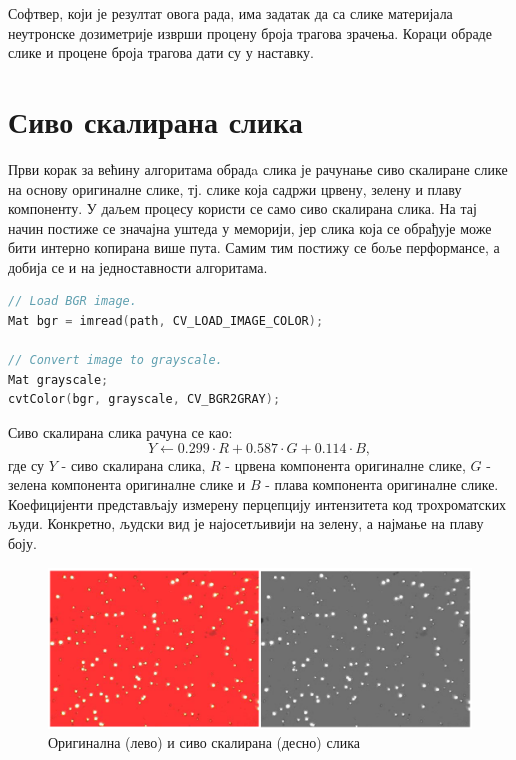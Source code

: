 \documentclass[11pt,a4paper,serbian,oneside]{book}
\begin{document}
Софтвер, који је резултат овога рада, има задатак да са слике материјала неутронске дозиметрије изврши процену броја трагова зрачења. Кораци обраде слике и процене броја трагова дати су у наставку.

\section{Сиво скалирана слика}

Први корак за већину алгоритама обрадa слика је рачунање сиво скалиране слике на основу оригиналне слике, тј. слике која садржи црвену, зелену и плаву компоненту. У даљем процесу користи се само сиво скалирана слика. На тај начин  постиже се значајна уштеда у меморији, јер слика која се обрађује може бити интерно копирана више пута.  Самим тим постижу се боље перформансе, а добија се и на једноставности алгоритама.

\begin{lstlisting}[language=C++,label=lst:grayscale,caption=Рачунање сиво скалиране слике]
// Load BGR image.
Mat bgr = imread(path, CV_LOAD_IMAGE_COLOR);

// Convert image to grayscale.
Mat grayscale;
cvtColor(bgr, grayscale, CV_BGR2GRAY);
\end{lstlisting}

Сиво скалирана слика рачуна се као:
\begin{equation}
Y \gets 0.299 \cdot R + 0.587 \cdot G + 0.114 \cdot B,
\end{equation}
где су $Y$ - сиво скалирана слика, $R$ - црвена компонента оригиналне слике, $G$ - зелена компонента оригиналне слике и $B$ - плава компонента оригиналне слике. Коефицијенти представљају измерену перцепцију интензитета код трохроматских људи. Конкретно, људски вид је најосетљивији на зелену, а најмање на плаву боју.

\begin{figure}
\begin{center}
\includegraphics[width=150mm]{images/original+grayscale.png}
\end{center}
\caption{Оригинална (лево) и сиво скалирана (десно) слика}
\label{fig:cv}
\end{figure}
\end{document}
